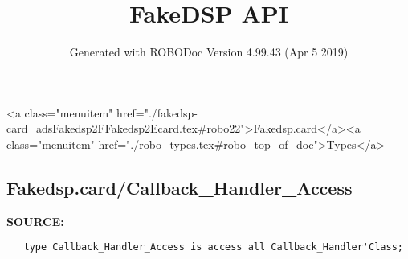 \documentclass{article}
\title{FakeDSP API}
\author{Generated with ROBODoc Version 4.99.43 (Apr  5 2019)
}
\begin{document}
\maketitle
\printindex
\tableofcontents
\newpage

<a class="menuitem" href="./fakedsp-card_adsFakedsp2FFakedsp2Ecard.tex#robo22">Fakedsp.card</a><a class="menuitem" href="./robo_types.tex#robo_top_of_doc">Types</a>\subsection{Fakedsp.card/Callback\_Handler\_Access}
\textbf{SOURCE:}\hspace{0.08in}\begin{verbatim}
   type Callback_Handler_Access is access all Callback_Handler'Class;
\end{verbatim}
\end{document}
